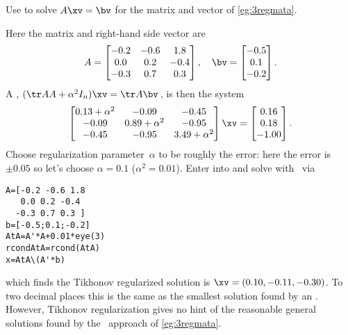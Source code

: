 \begin{example} 
Use  to solve \(A\xv=\bv\) for the matrix and vector of \cref{eg:3regmata}.
\begin{solution} 
Here the matrix and right-hand side vector are
\begin{equation*}
A=\begin{bmatrix} -0.2&-0.6&1.8
\\ 0.0&0.2&-0.4
\\ -0.3&0.7&0.3 \end{bmatrix}, \quad
\bv=\begin{bmatrix} -0.5
\\ 0.1
\\ -0.2
 \end{bmatrix}.
\end{equation*}
A , \((\tr AA+\alpha^2I_n)\xv=\tr A\bv\)\,, is then the system
\begin{equation*}
\begin{bmatrix} 0.13+\alpha^2&-0.09&-0.45
\\-0.09&0.89+\alpha^2 &-0.95
\\-0.45&-0.95&3.49+\alpha^2\end{bmatrix}\xv
=\begin{bmatrix} 0.16\\0.18\\-1.00 \end{bmatrix}.
\end{equation*}
Choose regularization parameter~\(\alpha\) to be roughly the error: here the error is~\(\pm0.05\) so let's choose \(\alpha=0.1\) (\(\alpha^2=0.01\)).
Enter into and solve with \script\ via
\begin{verbatim}
A=[-0.2 -0.6 1.8
   0.0 0.2 -0.4
  -0.3 0.7 0.3 ]
b=[-0.5;0.1;-0.2]
AtA=A'*A+0.01*eye(3)
rcondAtA=rcond(AtA)
x=AtA\(A'*b)
\end{verbatim}
\setbox\ajrqrbox\hbox{}%
\marginajrbox%
which finds the Tikhonov regularized solution is \(\xv=(0.10,-0.11,-0.30)\).
To two decimal places this is the same as the smallest solution found by an \svd.
However, Tikhonov regularization gives no hint of the reasonable general solutions found by the \svd\ approach of \cref{eg:3regmata}.
\end{solution}
\end{example}




